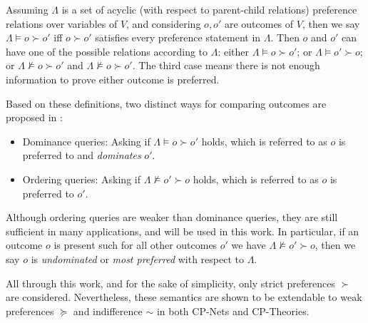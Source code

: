 Assuming $\Lambda$ is a set of acyclic (with respect to parent-child relations) preference relations over variables of $V$, and considering $o,o'$ are outcomes of $V$, then we say $\Lambda \models o \succ o'$ iff $o \succ o'$ satisfies every preference statement in $\Lambda$. 
Then $o$ and $o'$ can have one of the possible relations according to $\Lambda$: either $\Lambda \models o \succ o'$; or $\Lambda \models o' \succ o$; or $\Lambda \not\models o \succ o'$ and $\Lambda \not\models o \succ o'$. The third case means there is not enough information to prove either outcome is preferred. 

Based on these definitions, two distinct ways for comparing outcomes are proposed in \cite{Boutilier2004}:
\begin{itemize}
    \item Dominance queries: Asking if $\Lambda \models o \succ o'$ holds, which is referred to as $o$ is preferred to and \textit{dominates} $o'$.
    \item Ordering queries: Asking if $\Lambda \not\models o' \succ o$ holds, which is referred to as $o$ is preferred to $o'$.
\end{itemize}
Although ordering queries are weaker than dominance queries, they are still sufficient in many applications, and will be used in this work. In particular, if an outcome $o$ is present such for all other outcomes $o'$ we have $\Lambda \not\models o' \succ o$, then we say $o$ is \textit{undominated} or \textit{most preferred} with respect to $\Lambda$.

All through this work, and for the sake of simplicity, only strict preferences $\succ$ are considered. Nevertheless, these semantics are shown to be extendable to weak preferences $\succeq$ and indifference $\sim$ in both CP-Nets and CP-Theories.

